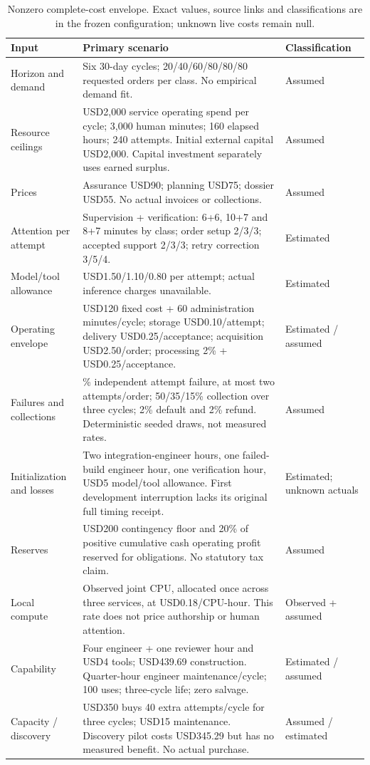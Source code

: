 \begin{table}[H]\small\begin{tabularx}{\linewidth}{>{\raggedright\arraybackslash}p{.24\linewidth}>{\raggedright\arraybackslash}X>{\raggedright\arraybackslash}p{.18\linewidth}}\toprule Input & Primary scenario & Classification \\\midrule
Horizon and demand & Six 30-day cycles; 20/40/60/80/80/80 requested orders per class. No empirical demand fit. & Assumed \\
Resource ceilings & USD2,000 service operating spend per cycle; 3,000 human minutes; 160 elapsed hours; 240 attempts. Initial external capital USD2,000. Capital investment separately uses earned surplus. & Assumed \\
Prices & Assurance USD90; planning USD75; dossier USD55. No actual invoices or collections. & Assumed \\
Attention per attempt & Supervision + verification: 6+6, 10+7 and 8+7 minutes by class; order setup 2/3/3; accepted support 2/3/3; retry correction 3/5/4. & Estimated \\
Model/tool allowance & USD1.50/1.10/0.80 per attempt; actual inference charges unavailable. & Estimated \\
Operating envelope & USD120 fixed cost + 60 administration minutes/cycle; storage USD0.10/attempt; delivery USD0.25/acceptance; acquisition USD2.50/order; processing 2\% + USD0.25/acceptance. & Estimated / assumed \\
Failures and collections & 8\% independent attempt failure, at most two attempts/order; 50/35/15\% collection over three cycles; 2\% default and 2\% refund. Deterministic seeded draws, not measured rates. & Assumed \\
Initialization and losses & Two integration-engineer hours, one failed-build engineer hour, one verification hour, USD5 model/tool allowance. First development interruption lacks its original full timing receipt. & Estimated; unknown actuals \\
Reserves & USD200 contingency floor and 20\% of positive cumulative cash operating profit reserved for obligations. No statutory tax claim. & Assumed \\
Local compute & Observed joint CPU, allocated once across three services, at USD0.18/CPU-hour. This rate does not price authorship or human attention. & Observed + assumed \\
Capability & Four engineer + one reviewer hour and USD4 tools; USD439.69 construction. Quarter-hour engineer maintenance/cycle; 100 uses; three-cycle life; zero salvage. & Estimated / assumed \\
Capacity / discovery & USD350 buys 40 extra attempts/cycle for three cycles; USD15 maintenance. Discovery pilot costs USD345.29 but has no measured benefit. No actual purchase. & Assumed / estimated \\\bottomrule\end{tabularx}
\caption{Nonzero complete-cost envelope. Exact values, source links and classifications are in the frozen configuration; unknown live costs remain null.}
\end{table}
